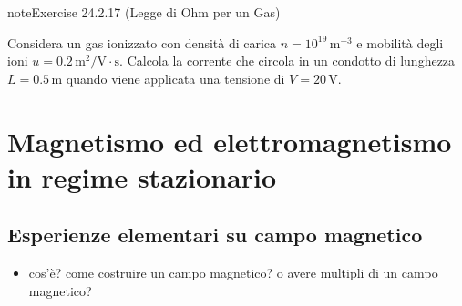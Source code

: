 \documentclass[letterpaper,10pt,italian]{jupyterBook}
\begin{document}
\begin{sphinxadmonition}{note}{Exercise 24.2.17 (Legge di Ohm per un Gas)}



\sphinxAtStartPar
Considera un gas ionizzato con densità di carica \(n = 10^{19} \, \text{m}^{-3}\) e mobilità degli ioni \(u = 0.2 \, \text{m}^2/\text{V} \cdot \text{s}\). Calcola la corrente che circola in un condotto di lunghezza \(L = 0.5 \, \text{m}\) quando viene applicata una tensione di \(V = 20 \, \text{V}\).
\end{sphinxadmonition}

\sphinxstepscope


\section{Magnetismo ed elettromagnetismo in regime stazionario}
\label{\detokenize{ch/electromagnetism/electromagnetism-steady:magnetismo-ed-elettromagnetismo-in-regime-stazionario}}\label{\detokenize{ch/electromagnetism/electromagnetism-steady:physics-hs-electromagnetism-electromagnetism-steady}}\label{\detokenize{ch/electromagnetism/electromagnetism-steady::doc}}

\subsection{Esperienze elementari su campo magnetico}
\label{\detokenize{ch/electromagnetism/electromagnetism-steady:esperienze-elementari-su-campo-magnetico}}\label{\detokenize{ch/electromagnetism/electromagnetism-steady:physics-hs-electromagnetism-electromagnetism-steady-experience}}\begin{itemize}
\item {} 
\sphinxAtStartPar
cos’è? come costruire un campo magnetico? o avere multipli di un campo magnetico?

\end{itemize}
\end{document}
